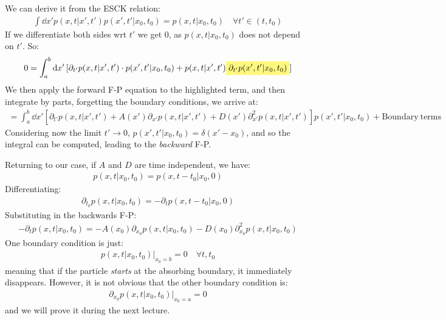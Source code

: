 \documentclass[../template.tex]{subfiles}
\begin{document}
We can derive it from the ESCK relation:
\begin{align*}
    \int \dd{x'} p(x,t|x',t') p(x',t'|x_0,t_0) = p (x,t|x_0,t_0) \quad \forall t' \in (t,t_0)
\end{align*}
If we differentiate both sides wrt $t'$ we get $0$, as $p(x,t|x_0,t_0)$ does not depend on $t'$. So:
\begin{align*}
    0 = \int_a^b \dd{x'} [\partial_{t'} p(x,t|x',t') \cdot p(x',t'|x_0, t_0) + p(x,t|x',t') \hlc{Yellow}{\partial_{t'} p(x',t'|x_0,t_0)}]
\end{align*}    
We then apply the forward F-P equation to the highlighted term, and then integrate by parts, forgetting the boundary conditions, we arrive at:
\begin{align*}
    = \int_a^b \dd{x'} [\partial_{t'} p(x,t|x',t') + A(x') \partial_{x'} p(x,t|x',t') + D(x') \partial_{x'}^2 p(x,t|x',t')] p(x',t'|x_0,t_0) + \mathrm{Boundary\ terms}
\end{align*}
Considering now the limit $t' \to 0$, $p(x',t'|x_0,t_0) = \delta(x'-x_0)$, and so the integral can be computed, leading to the \textit{backward} F-P.    

Returning to our case, if $A$ and $D$ are time independent, we have:
\begin{align*}
    p(x,t|x_0, t_0) = p(x,t-t_0|x_0,0)
\end{align*}  
Differentiating:
\begin{align*}
    \partial_{t_0} p(x,t|x_0,t_0) = -\partial_t p(x,t-t_0|x_0,0)
\end{align*}
Substituting in the backwards F-P:
\begin{align*}
    -\partial_t p(x,t|x_0,t_0) = -A(x_0)\partial_{x_0} p(x,t|x_0,t_0) -D(x_0) \partial_{x_0}^2 p(x,t|x_0,t_0)
\end{align*}
One boundary condition is just:
\begin{align*}
    p(x,t|x_0,t_0) \Big|_{x_0 = b} = 0 \quad \forall t,t_0
\end{align*}
meaning that if the particle \textit{starts} at the absorbing boundary, it immediately disappears. However, it is not obvious that the other boundary condition is:
\begin{align*}
    \partial_{x_0} p(x,t|x_0,t_0) \Big|_{x_0 = a} = 0
\end{align*} 
and we will prove it during the next lecture.
\end{document}
